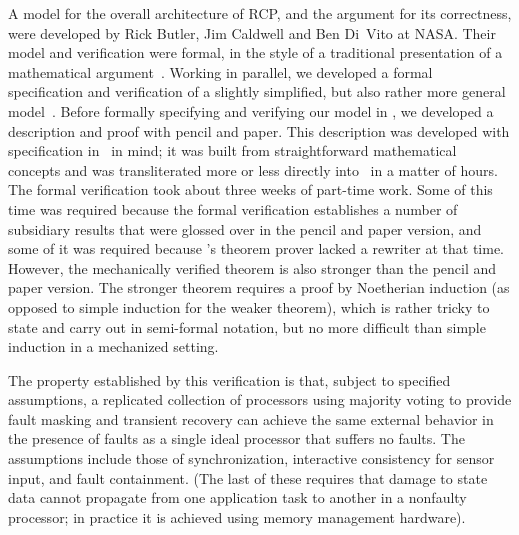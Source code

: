 A model for the overall architecture of RCP, and the argument for its
correctness, were developed by Rick Butler, Jim Caldwell and Ben
Di~Vito at NASA\@.  Their model and verification were formal, in the
style of a traditional presentation of a mathematical
argument~\cite{DBC91:DCCA}.  Working in parallel, we developed a
formal specification and verification of a slightly simplified, but
also rather more general model~\cite{Rushby93:masking}.  Before
formally specifying and verifying our model in \ehdm, we developed a
description and proof with pencil and paper.  This description was
developed with specification in \ehdm\ in mind; it was built from
straightforward mathematical concepts and was transliterated more or
less directly into \ehdm\ in a matter of hours.  The formal
verification took about three weeks of part-time work.  Some of this
time was required because the formal verification establishes a
number of subsidiary results that were glossed over in the pencil and
paper version, and some of it was required because \ehdm's theorem
prover lacked a rewriter at that time.  However, the mechanically
verified theorem is also stronger than the pencil and paper version.
The stronger theorem requires a proof by Noetherian induction (as
opposed to simple induction for the weaker theorem), which is rather
tricky to state and carry out in semi-formal notation, but no more
difficult than simple induction in a mechanized setting.

The property established by this verification is that, subject to
specified assumptions, a replicated collection of processors using
majority voting to provide fault masking and transient recovery can
achieve the same external behavior in the presence of faults as a
single ideal processor that suffers no faults.  The assumptions
include those of synchronization, interactive consistency for sensor
input, and fault containment.  (The last of these requires that damage
to state data cannot propagate from one application task to another in
a nonfaulty processor; in practice it is achieved using memory
management hardware).

